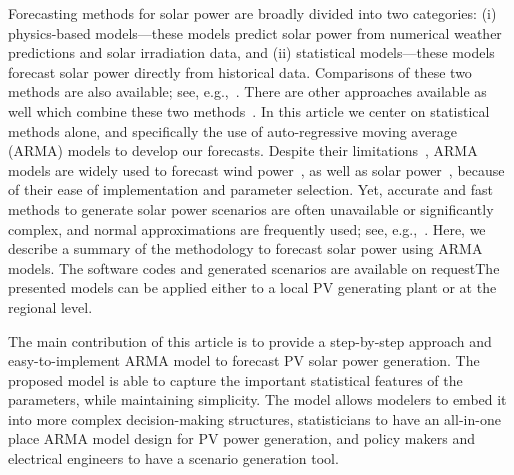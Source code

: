 \documentclass[review]{elsarticle}
\begin{document}
Forecasting methods for solar power are broadly divided 
into two categories: (i) physics-based models---these models predict solar 
power 
from numerical weather predictions and solar irradiation data, and (ii) 
statistical models---these 
models forecast 
solar power directly from historical data. Comparisons of these two 
methods are also available; see, 
e.g.,~\cite{huang2010comparative,inman2013solar}. There are other 
approaches available as well which combine these two 
methods~\cite{dong2015novel}. 
In this article we center on  statistical  methods alone, and specifically the 
use of auto-regressive moving average (ARMA) 
models to develop our forecasts. 
Despite 
their limitations~\cite{yang2018history}, ARMA models
are widely used to forecast wind power~\cite{brown1984time, 
duran2007short}, as well as solar 
power~\cite{mora1998multiplicative,yang2012hourly}, because of their ease of 
implementation and parameter selection.  Yet, accurate and 
fast methods to generate solar power scenarios are often unavailable or 
significantly complex, and normal approximations are frequently used; see, 
e.g.,~\cite{su2014stochastic}. 
Here, 
we describe a summary of the methodology to forecast solar power using 
ARMA models. The software codes and generated scenarios are 
available on requestThe presented models can 
be applied either to a local PV generating plant or  at the regional 
level.


The main contribution of this article is to provide a step-by-step approach and 
easy-to-implement ARMA model to forecast PV solar power generation. The 
proposed model is able to capture the important statistical features of the 
parameters, while maintaining simplicity. The model allows modelers to embed
it into more complex decision-making structures, statisticians to have an 
all-in-one place ARMA model design for PV power generation, and policy 
makers and electrical engineers to have a scenario generation tool. 

% 
\end{document}
